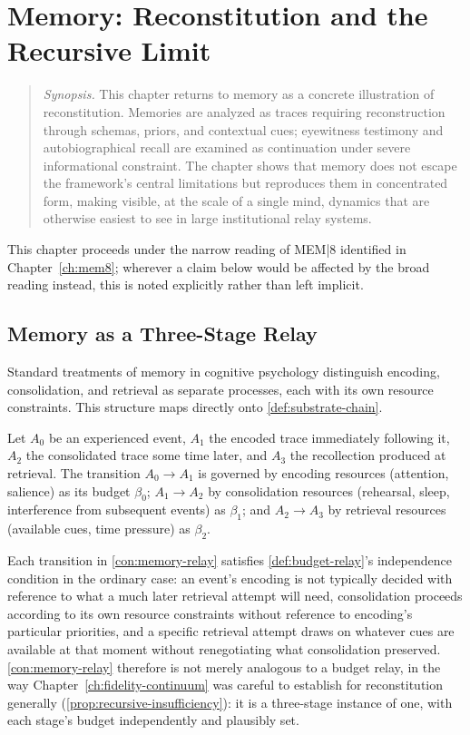 \chapter{Memory: Reconstitution and the Recursive Limit}
\label{ch:memory}

\begin{quotation}
\noindent\textit{Synopsis.} This chapter returns to memory as a concrete
illustration of reconstitution. Memories are analyzed as traces requiring
reconstruction through schemas, priors, and contextual cues; eyewitness
testimony and autobiographical recall are examined as continuation under
severe informational constraint. The chapter shows that memory does not
escape the framework's central limitations but reproduces them in
concentrated form, making visible, at the scale of a single mind, dynamics
that are otherwise easiest to see in large institutional relay systems.
\end{quotation}

This chapter proceeds under the narrow reading of MEM|8 identified in
Chapter~\ref{ch:mem8}; wherever a claim below would be affected by the
broad reading instead, this is noted explicitly rather than left
implicit.

\section{Memory as a Three-Stage Relay}

Standard treatments of memory in cognitive psychology distinguish
encoding, consolidation, and retrieval as separate processes, each with
its own resource constraints. This structure maps directly onto
\cref{def:substrate-chain}.

\begin{construction}
\label{con:memory-relay}
Let $A_0$ be an experienced event, $A_1$ the encoded trace immediately
following it, $A_2$ the consolidated trace some time later, and $A_3$
the recollection produced at retrieval. The transition $A_0 \to A_1$ is
governed by encoding resources (attention, salience) as its budget
$\beta_0$; $A_1 \to A_2$ by consolidation resources (rehearsal, sleep,
interference from subsequent events) as $\beta_1$; and $A_2 \to A_3$ by
retrieval resources (available cues, time pressure) as $\beta_2$.
\end{construction}

Each transition in \cref{con:memory-relay} satisfies
\cref{def:budget-relay}'s independence condition in the ordinary case: an
event's encoding is not typically decided with reference to what a much
later retrieval attempt will need, consolidation proceeds according to
its own resource constraints without reference to encoding's particular
priorities, and a specific retrieval attempt draws on whatever cues are
available at that moment without renegotiating what consolidation
preserved. \cref{con:memory-relay} therefore is not merely analogous to a
budget relay, in the way Chapter~\ref{ch:fidelity-continuum} was careful
to establish for reconstitution generally (\cref{prop:recursive-insufficiency}):
it is a three-stage instance of one, with each stage's budget
independently and plausibly set.

